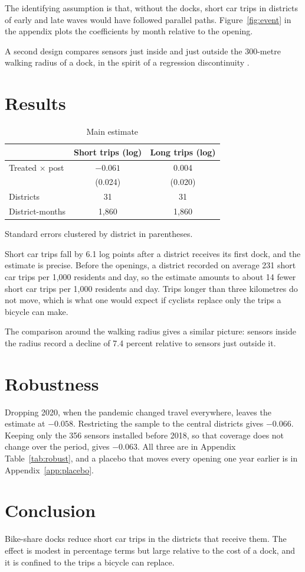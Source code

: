 The identifying assumption is that, without the docks, short car trips in districts of early and late waves would have followed parallel paths. Figure~\ref{fig:event} in the appendix plots the coefficients by month relative to the opening.

A second design compares sensors just inside and just outside the 300-metre walking radius of a dock, in the spirit of a regression discontinuity \citep{imbens2008regression}.

\section{Results}\label{sec:results}
\begin{table}[h]
  \centering
  \caption{Main estimate}\label{tab:main}
  \begin{tabular}{lcc}
    \toprule
    & Short trips (log) & Long trips (log) \\
    \midrule
    Treated $\times$ post & $-0.061$ & 0.004 \\
                          & (0.024) & (0.020) \\
    \midrule
    Districts & 31 & 31 \\
    District-months & 1,860 & 1,860 \\
    \bottomrule
  \end{tabular}

  \smallskip
  {\footnotesize Standard errors clustered by district in parentheses.}
\end{table}

Short car trips fall by 6.1 log points after a district receives its first dock, and the estimate is precise. Before the openings, a district recorded on average 231 short car trips per 1,000 residents and day, so the estimate amounts to about 14 fewer short car trips per 1,000 residents and day. Trips longer than three kilometres do not move, which is what one would expect if cyclists replace only the trips a bicycle can make.

The comparison around the walking radius gives a similar picture: sensors inside the radius record a decline of 7.4 percent relative to sensors just outside it.

\section{Robustness}\label{sec:robust}
Dropping 2020, when the pandemic changed travel everywhere, leaves the estimate at $-0.058$. Restricting the sample to the central districts gives $-0.066$. Keeping only the 356 sensors installed before 2018, so that coverage does not change over the period, gives $-0.063$. All three are in Appendix Table~\ref{tab:robust}, and a placebo that moves every opening one year earlier is in Appendix~\ref{app:placebo}.

\section{Conclusion}\label{sec:conclusion}
Bike-share docks reduce short car trips in the districts that receive them. The effect is modest in percentage terms but large relative to the cost of a dock, and it is confined to the trips a bicycle can replace.
